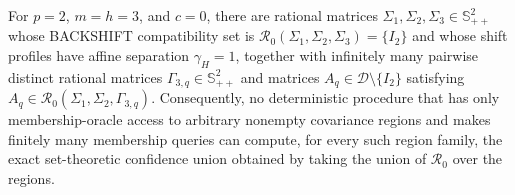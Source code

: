 For \(p=2\), \(m=h=3\), and \(c=0\), there are rational matrices \(\Sigma_1,\Sigma_2,\Sigma_3\in\mathbb S_{++}^2\) whose BACKSHIFT compatibility set is \(\mathcal R_0(\Sigma_1,\Sigma_2,\Sigma_3)=\{I_2\}\) and whose shift profiles have affine separation \(\gamma_H=1\), together with infinitely many pairwise distinct rational matrices \(\Gamma_{3,q}\in\mathbb S_{++}^2\) and matrices \(A_q\in\mathcal D\setminus\{I_2\}\) satisfying \(A_q\in\mathcal R_0(\Sigma_1,\Sigma_2,\Gamma_{3,q})\). Consequently, no deterministic procedure that has only membership-oracle access to arbitrary nonempty covariance regions and makes finitely many membership queries can compute, for every such region family, the exact set-theoretic confidence union obtained by taking the union of \(\mathcal R_0\) over the regions.